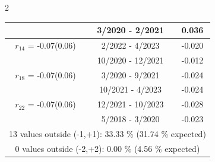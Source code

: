 \begin{multicols}{2}
{\begin{tabular}{ccc}
&        3/2020 -  2/2021 &        0.036  \vspace{-.02in} \\ \hline 
  $r_{14}$ = -0.07(0.06) &       2/2022 -  4/2023 &       -0.020    \vspace{-.10in} \\ 
  &       10/2020 - 12/2021 &       -0.012  \vspace{-.02in}   \\ \hline 
    $r_{18}$ = -0.07(0.06) &       3/2020 -  9/2021 &       -0.024    \vspace{-.10in} \\ 
  &       10/2021 -  4/2023 &       -0.024  \vspace{-.02in}   \\ \hline 
    $r_{22}$ = -0.07(0.06) &      12/2021 - 10/2023 &       -0.028    \vspace{-.10in} \\ 
  &        5/2018 -  3/2020 &       -0.023  \vspace{-.02in}   \\ \hline 
  \multicolumn{3}{c}{              13 values outside (-1,+1): 33.33  \% (31.74  \% expected)}\vspace{-.10in} \\ 
\multicolumn{3}{c}{               0 values outside (-2,+2):  0.00 \%  (4.56 \% expected) } \\
 \end{tabular} \\ 
 } 
\end{multicols} 
